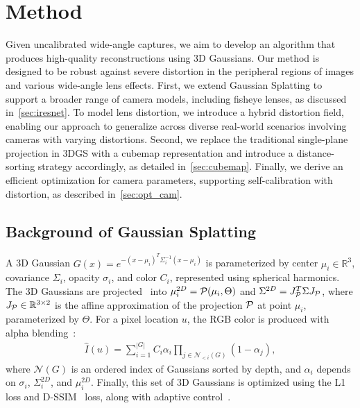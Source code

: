 

\section{Method}
\label{sec:method}
Given uncalibrated wide-angle captures, we aim to develop an algorithm that produces high-quality reconstructions using 3D Gaussians. Our method is designed to be robust against severe distortion in the peripheral regions of images and various wide-angle lens effects.
First, we extend Gaussian Splatting to support a broader range of camera models, including fisheye lenses, as discussed in~\cref{sec:iresnet}. To model lens distortion, we introduce a hybrid distortion field, enabling our approach to generalize across diverse real-world scenarios involving cameras with varying distortions.
Second, we replace the traditional single-plane projection in 3DGS with a cubemap representation and introduce a distance-sorting strategy accordingly, as detailed in~\cref{sec:cubemap}.
Finally, we derive an efficient optimization for camera parameters, supporting self-calibration with distortion, as described in~\cref{sec:opt_cam}.


\subsection{Background of Gaussian Splatting} 
A 3D Gaussian $G(x) = e^{-(x-\mu_i)^T\Sigma_i^{-1} (x-\mu_i)}$ is parameterized by center $\mu_i\in\mathbb{R}^3$, covariance $\Sigma_i$, opacity $\sigma_i$, and color $C_i$, represented using spherical harmonics. The 3D Gaussians are projected~\cite{zwicker2001ewa} into $\mu_i^{2D} = \mathcal{P}(\mu_i, \Theta)$ and $\Sigma^{2D}=J_{\mathcal{P}}^T\Sigma J_{\mathcal{P}}$, where $J_{\mathcal{P}}\in\mathbb{R}^{3\times 2}$ is the affine approximation of the projection $\mathcal{P}$ at point $\mu_i$, parameterized by $\Theta$. 
For a pixel location $u$, the RGB color is produced with alpha blending~\cite{kopanas2021point,yifan2019differentiable}:
\begin{align}
\label{eq:alpha_blending}
    \hat{I}(u) = \sum_{i=1}^{|G|}C_i\alpha_i\prod_{j\in \mathcal{N}_{<i}(G)}(1-\alpha_j),
\end{align}
where $\mathcal{N}(G)$ is an ordered index of Gaussians sorted by depth, and $\alpha_i$ depends on $\sigma_i$, $\Sigma_i^{2D}$, and $\mu_i^{2D}$. Finally, this set of 3D Gaussians is optimized using the L1 loss and D-SSIM~\cite{baker2022dssim} loss, along with adaptive control~\cite{kerbl20233d}.

